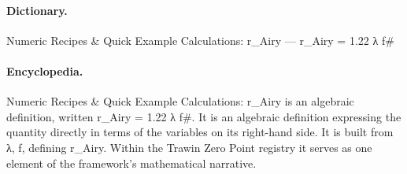 \paragraph{Dictionary.}
Numeric Recipes \& Quick Example Calculations: r\_Airy — r\_Airy = 1.22 λ f\#

\paragraph{Encyclopedia.}
Numeric Recipes \& Quick Example Calculations: r\_Airy is an algebraic definition, written r\_Airy = 1.22 λ f\#. It is an algebraic definition expressing the quantity directly in terms of the variables on its right-hand side. It is built from λ, f, defining r\_Airy. Within the Trawin Zero Point registry it serves as one element of the framework's mathematical narrative.

